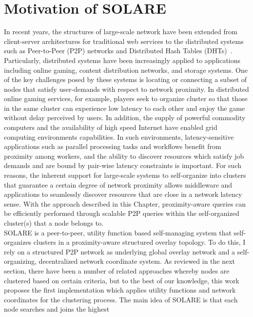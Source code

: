 \section{Motivation of SOLARE}
\label{solare:motivation}
In recent years, the structures of large-scale network have been
extended from client-server architectures for traditional web services
to the distributed systems such as Peer-to-Peer (P2P) networks and
Distributed Hash Tables (DHTs)~\cite{chord, can, tapestry}.
%
Particularly, distributed systems have been increasingly applied to
applications including online gaming, content distribution networks, and
storage systems.
%
One of the key challenges posed by these systems is locating or
connecting a subset of nodes that satisfy user-demands with respect to
network proximity.
%
In distributed online gaming services, for example, players seek to
organize cluster so that those in the same cluster can experience low
latency to each other and enjoy the game without delay perceived by
users.
%
In addition, the supply of powerful commodity computers and the
availability of high speed Internet have enabled grid computing
environments capabilities.
%
In such environments, latency-sensitive applications such as parallel
processing tasks and workflows benefit from proximity among workers, and
the ability to discover resources which satisfy job demands and are
bound by pair-wise latency constraints is important.
%
For such reasons, the inherent support for large-scale systems to
self-organize into clusters that guarantee a certain degree of network
proximity allows middleware and applications to seamlessly discover
resources that are close in a network latency sense.
%
With the approach described in this Chapter, proximity-aware queries can
be efficiently performed through scalable P2P queries within the
self-organized cluster(s) that a node belongs to.\\
%
SOLARE is a peer-to-peer, utility function based self-managing system
that self-organizes clusters in a proximity-aware structured overlay
topology.
%
To do this, I rely on a structured P2P network as underlying global
overlay network and a self-organizing, decentralized network coordinate
system.
%
As reviewed in the next section, there have been a number of related
approaches whereby nodes are clustered based on certain criteria, but to
the best of our knowledge, this work proposes the first implementation
which applies utility functions and network coordinates for the
clustering process.
%
The main idea of SOLARE is that each node searches and joins the highest
